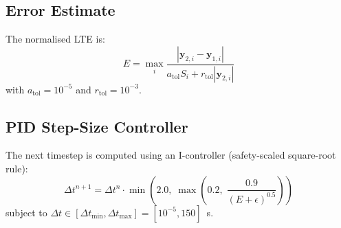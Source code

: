 \subsection{Error Estimate}

The normalised LTE is:
\begin{equation}
  E = \max_i \frac{|\mathbf{y}_{2,i} - \mathbf{y}_{1,i}|}{a_\text{tol} S_i + r_\text{tol} |\mathbf{y}_{2,i}|}
  \label{eq:lte}
\end{equation}
with $a_\text{tol} = 10^{-5}$ and $r_\text{tol} = 10^{-3}$.

\subsection{PID Step-Size Controller}

The next timestep is computed using an I-controller (safety-scaled square-root rule):
\begin{equation}
  \Delta t^{n+1} = \Delta t^n \cdot \min\!\left(2.0,\; \max\!\left(0.2,\; \frac{0.9}{(E + \epsilon)^{0.5}}\right)\right)
  \label{eq:pid_dt}
\end{equation}
subject to $\Delta t \in [\Delta t_\text{min}, \Delta t_\text{max}] = [10^{-5}, 150]$~s.
